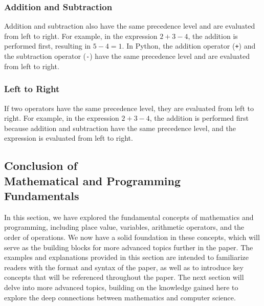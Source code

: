 \subsubsection{Addition and Subtraction}
Addition and subtraction also have the same precedence level and are evaluated from left to right. For example, in the expression $2 + 3 - 4$, the addition is performed first, resulting in $5 - 4 = 1$. In Python, the addition operator (\lstinline|+|) and the subtraction operator (\lstinline|-|) have the same precedence level and are evaluated from left to right.
\subsubsection{Left to Right}
If two operators have the same precedence level, they are evaluated from left to right. For example, in the expression $2 + 3 - 4$, the addition is performed first because addition and subtraction have the same precedence level, and the expression is evaluated from left to right.

\subsection{Conclusion of \\ Mathematical and Programming \\ Fundamentals}
In this section, we have explored the fundamental concepts of mathematics and programming, including place value, variables, arithmetic operators, and the order of operations. We now have a solid foundation in these concepts, which will serve as the building blocks for more advanced topics further in the paper. The examples and explanations provided in this section are intended to familiarize readers with the format and syntax of the paper, as well as to introduce key concepts that will be referenced throughout the paper. The next section will delve into more advanced topics, building on the knowledge gained here to explore the deep connections between mathematics and computer science.

